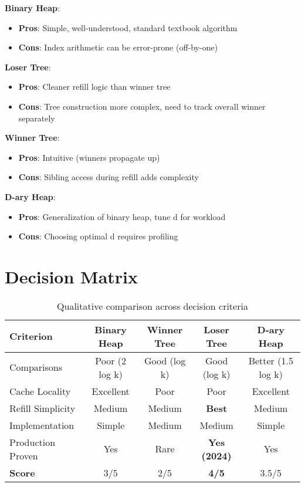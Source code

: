 \documentclass[11pt]{article}
\begin{document}
\textbf{Binary Heap}:
\begin{itemize}
    \item \textbf{Pros}: Simple, well-understood, standard textbook algorithm
    \item \textbf{Cons}: Index arithmetic can be error-prone (off-by-one)
\end{itemize}

\textbf{Loser Tree}:
\begin{itemize}
    \item \textbf{Pros}: Cleaner refill logic than winner tree
    \item \textbf{Cons}: Tree construction more complex, need to track overall winner separately
\end{itemize}

\textbf{Winner Tree}:
\begin{itemize}
    \item \textbf{Pros}: Intuitive (winners propagate up)
    \item \textbf{Cons}: Sibling access during refill adds complexity
\end{itemize}

\textbf{D-ary Heap}:
\begin{itemize}
    \item \textbf{Pros}: Generalization of binary heap, tune d for workload
    \item \textbf{Cons}: Choosing optimal d requires profiling
\end{itemize}

\section{Decision Matrix}

\begin{table}[h]
\centering
\begin{tabular}{lcccc}
\toprule
\textbf{Criterion} & \textbf{Binary Heap} & \textbf{Winner Tree} & \textbf{Loser Tree} & \textbf{D-ary Heap} \\
\midrule
Comparisons & Poor (2 log k) & Good (log k) & Good (log k) & Better (1.5 log k) \\
Cache Locality & Excellent & Poor & Poor & Excellent \\
Refill Simplicity & Medium & Medium & \textbf{Best} & Medium \\
Implementation & Simple & Medium & Medium & Simple \\
Production Proven & Yes & Rare & \textbf{Yes (2024)} & Yes \\
\midrule
\textbf{Score} & 3/5 & 2/5 & \textbf{4/5} & 3.5/5 \\
\bottomrule
\end{tabular}
\caption{Qualitative comparison across decision criteria}
\end{table}
\end{document}
